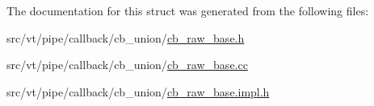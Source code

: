The documentation for this struct was generated from the following files\+:\begin{DoxyCompactItemize}
\item 
src/vt/pipe/callback/cb\+\_\+union/\hyperlink{cb__raw__base_8h}{cb\+\_\+raw\+\_\+base.\+h}\item 
src/vt/pipe/callback/cb\+\_\+union/\hyperlink{cb__raw__base_8cc}{cb\+\_\+raw\+\_\+base.\+cc}\item 
src/vt/pipe/callback/cb\+\_\+union/\hyperlink{cb__raw__base_8impl_8h}{cb\+\_\+raw\+\_\+base.\+impl.\+h}\end{DoxyCompactItemize}
